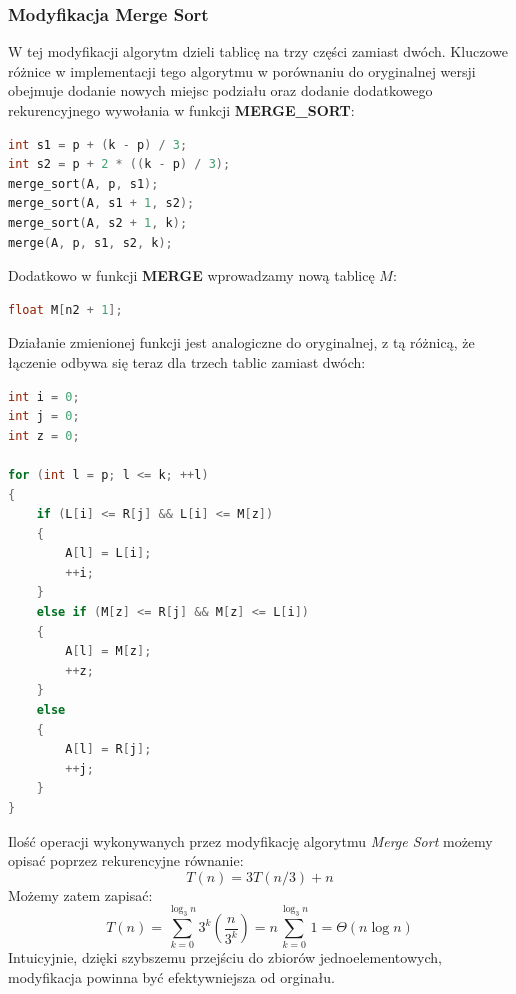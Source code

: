 \documentclass{article}
\begin{document}
\subsubsection{Modyfikacja Merge Sort}
W tej modyfikacji algorytm dzieli tablicę na trzy części zamiast dwóch. Kluczowe różnice w implementacji tego algorytmu w porównaniu do oryginalnej wersji obejmuje dodanie nowych miejsc podziału oraz dodanie dodatkowego rekurencyjnego wywołania w funkcji \textbf{MERGE\_SORT}:

\begin{lstlisting}[style=mystyle, language=C++, caption={Fragment implementacji modyfikacji \texttt{Merge Sort}}, label={lst:mergesort2}]
int s1 = p + (k - p) / 3;
int s2 = p + 2 * ((k - p) / 3);
merge_sort(A, p, s1);
merge_sort(A, s1 + 1, s2);
merge_sort(A, s2 + 1, k);
merge(A, p, s1, s2, k);
\end{lstlisting}

Dodatkowo w funkcji \textbf{MERGE} wprowadzamy nową tablicę $M$:
\begin{lstlisting}[style=mystyle, language=C++, caption={Fragment implementacji modyfikacji \texttt{Merge}}, label={lst:merge2}]
float M[n2 + 1];
\end{lstlisting}

Działanie zmienionej funkcji jest analogiczne do oryginalnej, z tą różnicą, że łączenie odbywa się teraz dla trzech tablic zamiast dwóch:
\begin{lstlisting}[style=mystyle, language=C++, caption={Fragment implementacji modyfikacji \texttt{Merge}}, label={lst:merge2l}]
int i = 0;
int j = 0;
int z = 0;

for (int l = p; l <= k; ++l)
{
    if (L[i] <= R[j] && L[i] <= M[z])
    {
        A[l] = L[i];
        ++i;
    }
    else if (M[z] <= R[j] && M[z] <= L[i])
    {
        A[l] = M[z];
        ++z;
    }
    else
    {
        A[l] = R[j];
        ++j;
    }
}
\end{lstlisting}
Ilość operacji wykonywanych przez modyfikację algorytmu \textit{Merge Sort} możemy opisać poprzez rekurencyjne równanie:
\[
    T(n) = 3T(n/3) + n
\]
Możemy zatem zapisać:
\[
    T(n) = \sum_{k=0}^{\log_3 n} 3^k\left(\frac{n}{3^k}\right) = n\sum_{k=0}^{\log_3 n} 1 = \Theta(n \log n)
\]
Intuicyjnie, dzięki szybszemu przejściu do zbiorów jednoelementowych, modyfikacja powinna być efektywniejsza od orginału.
\end{document}
